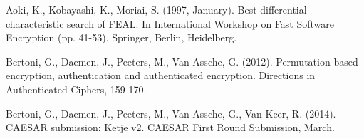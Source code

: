 %
%
%

% 
%
\begin{thebibliography}{8}













Aoki, K., Kobayashi, K.,  Moriai, S. (1997, January). Best differential characteristic search of FEAL. In International Workshop on Fast Software Encryption (pp. 41-53). Springer, Berlin, Heidelberg.

Bertoni, G., Daemen, J., Peeters, M.,  Van Assche, G. (2012). Permutation-based encryption, authentication and authenticated encryption. Directions in Authenticated Ciphers, 159-170.

Bertoni, G., Daemen, J., Peeters, M., Van Assche, G.,  Van Keer, R. (2014). CAESAR submission: Ketje v2. CAESAR First Round Submission, March.


\end{thebibliography}

